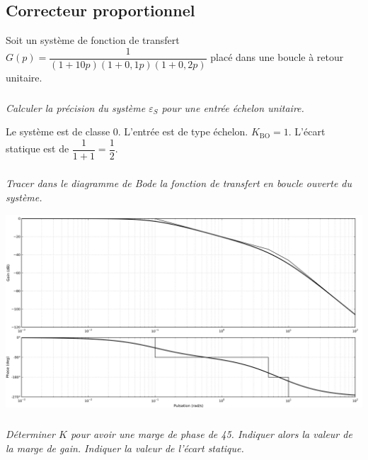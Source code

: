 \documentclass[10pt,fleqn]{article} %
\begin{document}
\def\pathfig{images}

\vspace{4.5cm}
\pagestyle{fancy}
\thispagestyle{plain}

\def\columnseprulecolor{\color{ocre}}
\setlength{\columnseprule}{0.4pt} 

\def\pathfig{images}

\begin{multicols}{2}
\subsection*{Correcteur proportionnel}
Soit un système de fonction de transfert $G(p)=\dfrac{1}{\left(1+10p\right)\left(1+0,1p\right)\left(1+0,2p\right)}$ placé dans une boucle à retour unitaire.

\subparagraph{}\textit{Calculer la précision du système $\varepsilon_S$ pour une entrée échelon unitaire.}
\ifprof
\begin{corrige}
Le système est de classe 0. L'entrée est de type échelon. $K_{\text{BO}}=1$.
L'écart statique est de $\dfrac{1}{1+1}=\dfrac{1}{2}$.
\end{corrige}
\else
\fi

\subparagraph{}\textit{Tracer dans  le diagramme de Bode la fonction de transfert en boucle ouverte du système.}
\ifprof
\begin{corrige}
\begin{center}
\includegraphics[width=.9\linewidth]{images/01_Bode}
\end{center}
\end{corrige}
\else
\fi


\subparagraph{}\textit{Déterminer $K$ pour avoir une marge de phase de 45\degres. Indiquer alors la valeur de la marge de gain. Indiquer la valeur de l'écart statique.}

\ifprof
\begin{corrige} ~\\


\end{corrige}
\end{multicols}
\end{document}
